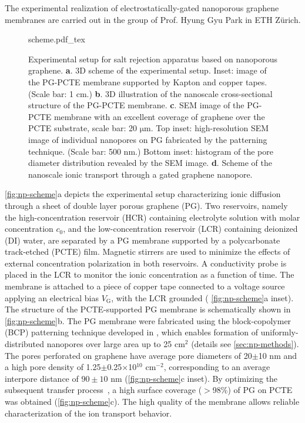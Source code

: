 The experimental realization of electrostatically-gated nanoporous
graphene membranes are carried out in the group of Prof. Hyung Gyu
Park in ETH Zürich.

\begin{figure}[!htbp]
  \centering
  {scheme.pdf_tex}
  \caption{Experimental setup for salt rejection apparatus based on
    nanoporous graphene.  \textbf{a}. 3D scheme of the experimental
    setup. Inset: image of the PG-PCTE membrane supported by Kapton
    and copper tapes. (Scale bar: 1 cm.)  \textbf{b}. 3D illustration
    of the nanoscale cross-sectional structure of the PG-PCTE
    membrane. \textbf{c}. SEM image of the PG-PCTE membrane with an
    excellent coverage of graphene over the PCTE substrate, scale bar:
    20 $\mathrm{\mu}$m.  Top inset: high-resolution SEM image of
    individual nanopores on PG fabricated by the patterning
    technique. (Scale bar: 500 nm.)  Bottom inset: histogram of
    the pore diameter distribution revealed by the SEM
    image. \textbf{d}. Scheme of the nanoscale ionic transport
    through a gated graphene nanopore.}
  \label{fig:np-scheme}
\end{figure}

%
 \autoref{fig:np-scheme}a depicts the experimental setup characterizing
ionic diffusion through a sheet of double layer porous graphene
(PG).
%
Two reservoirs, namely the high-concentration reservoir (HCR)
containing electrolyte solution with molar concentration $c_0$, and
the low-concentration reservoir (LCR) containing deionized (DI)
water, are separated by a PG membrane supported by a polycarbonate
track-etched (PCTE) film.
%
Magnetic stirrers are used to minimize the effects of external
concentration polarization in both reservoirs.
%
A conductivity
probe is placed in the LCR to monitor the ionic concentration as a
function of time. The membrane is attached to a piece of copper tape
connected to a voltage source applying an electrical bias
$V_{\mathrm{G}}$, with the LCR grounded ( \autoref{fig:np-scheme}a
inset).
%
The structure of the PCTE-supported PG membrane is schematically shown
in \autoref{fig:np-scheme}b. The PG membrane were fabricated using the
block-copolymer (BCP) patterning technique developed in
\autocite{Choi_2018_wafer_scale_gr}, which enables formation of
uniformly-distributed nanopores over large area up to 25 cm$^{2}$
(details see \autoref{sec:np-methods}).
%
The pores perforated on graphene have average pore diameters of
20$\pm$10 nm and a high pore density of 1.25$\pm$0.25$\times$10$^{10}$
cm$^{-2}$, corresponding to an average inter\-pore distance of
$90\pm10$ nm  (\autoref{fig:np-scheme}c inset).
%
By optimizing the subsequent transfer
process~\autocite{Choi_2018_wafer_scale_gr}, a high surface coverage
($>$98\%) of PG on PCTE was obtained (\autoref{fig:np-scheme}c).
The high quality of the membrane allows
reliable characterization of the ion transport behavior.
%


